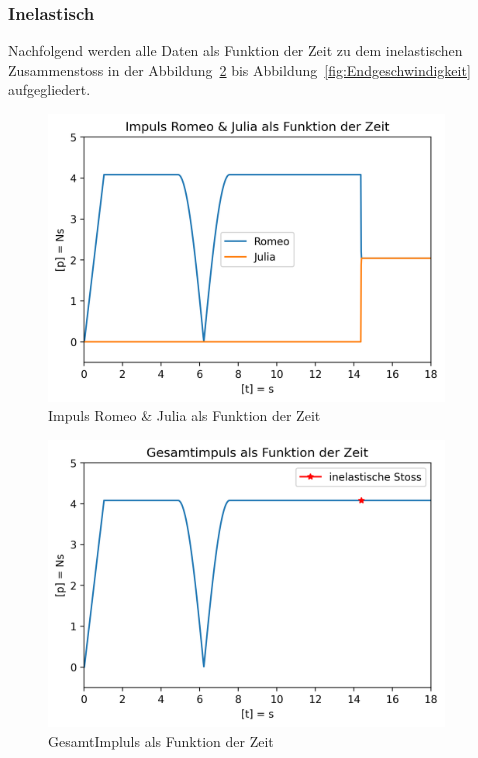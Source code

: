 \documentclass[../main.tex]{subfiles}
\begin{document}
    \newpage
    \subsubsection{Inelastisch}
    Nachfolgend werden alle Daten als Funktion der Zeit zu dem inelastischen Zusammenstoss in der
    Abbildung~\ref{fig:gesamtImpuls} bis Abbildung~\ref{fig:Endgeschwindigkeit}
    aufgegliedert.

    \begin{figure}[H]
        \begin{center}
            \centerline{\includegraphics[width=105mm]{./images/Inelastisch/ImpulsRomeoJulia}}
            \caption{Impuls Romeo \& Julia als Funktion der Zeit}
            \label{fig:ImpulsRomeoJulia}
        \end{center}
    \end{figure}

    \begin{figure}[H]
        \begin{center}
            \centerline{\includegraphics[width=105mm]{./images/Inelastisch/GesamtImpluls}}
            \caption{GesamtImpluls als Funktion der Zeit}
            \label{fig:gesamtImpuls}
        \end{center}
    \end{figure}
\end{document}
